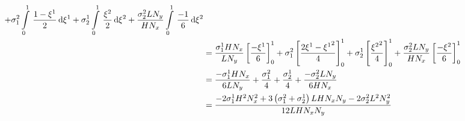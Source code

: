 \begin{equation}
\begin{aligned}
    +\conductivitytensorsymbol^{2}_{1}\gint{0}{1}{\dfrac{1-\xione}{2}}{\xione}
    +\conductivitytensorsymbol^{1}_{2}\gint{0}{1}{\dfrac{\xitwo}{2}}{\xitwo}
    +\dfrac{\conductivitytensorsymbol^{2}_{2} L N_{y}}{H N_{x}}\gint{0}{1}{\dfrac{-1}{6}}{\xitwo} \\
    &=\dfrac{\conductivitytensorsymbol^{1}_{1} H N_{x}}{L N_{y}}\sqbrac{\dfrac{-\xione}{6}}^{1}_{0}
    +\conductivitytensorsymbol^{2}_{1}\sqbrac{\dfrac{2\xione-\xionesq}{4}}^{1}_{0}
    +\conductivitytensorsymbol^{1}_{2}\sqbrac{\dfrac{\xitwosq}{4}}^{1}_{0}
    +\dfrac{\conductivitytensorsymbol^{2}_{2} L N_{y}}{H N_{x}}\sqbrac{\dfrac{-\xitwo}{6}}^{1}_{0} \\
    &=\dfrac{-\conductivitytensorsymbol^{1}_{1} H N_{x}}{6 L N_{y}}+\dfrac{\conductivitytensorsymbol^{2}_{1}}{4}+
    \dfrac{\conductivitytensorsymbol^{1}_{2}}{4}+\dfrac{-\conductivitytensorsymbol^{2}_{2} L N_{y}}{6 H N_{x}} \\
    &=\dfrac{-2\conductivitytensorsymbol^{1}_{1}H^{2}N_{x}^{2}+3\pbrac{\conductivitytensorsymbol^{2}_{1}+
        \conductivitytensorsymbol^{1}_{2}}L H N_{x} N_{y}-2\conductivitytensorsymbol^{2}_{2}L^{2}N_{y}^{2}}{12 L H N_{x} N_{y}}
  \end{aligned}
\end{equation}

